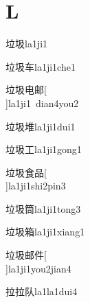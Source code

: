 \section*{L}

\begin{verbete}[8;6]{垃圾}{la1ji1}
\end{verbete}

\begin{verbete}[8;6;4]{垃圾车}{la1ji1che1}
\end{verbete}

\begin{verbete}[8;6;5;7]{垃圾电邮}[\\]{la1ji1\ dian4you2}
\end{verbete}

\begin{verbete}[8;6;11]{垃圾堆}{la1ji1dui1}
\end{verbete}

\begin{verbete}[8;6;3]{垃圾工}{la1ji1gong1}
\end{verbete}

\begin{verbete}[8;6;9;9]{垃圾食品}[\\]{la1ji1shi2pin3}
\end{verbete}

\begin{verbete}[8;6;12]{垃圾筒}{la1ji1tong3}
\end{verbete}

\begin{verbete}[8;6;15]{垃圾箱}{la1ji1xiang1}
\end{verbete}

\begin{verbete}[8;6;7;6]{垃圾邮件}[\\]{la1ji1you2jian4}
\end{verbete}

\begin{verbete}[8;8;4]{拉拉队}{la1la1dui4}
\end{verbete}

